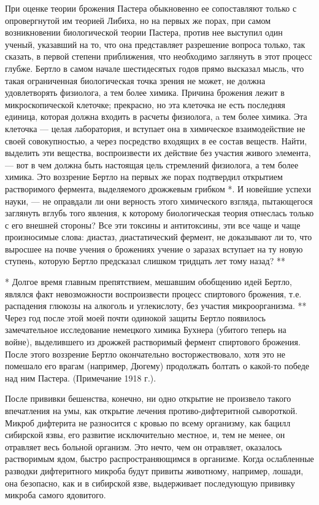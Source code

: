 При оценке теории брожения  Пастера обыкновенно ее сопоставляют только
с опровергнутой  им теорией Либиха, но  на первых же порах,  при самом
возникновении биологической  теории Пастера, против нее  выступил один
ученый,  указавший  на то,  что  она  представляет разрешение  вопроса
только,  так сказать,  в  первой степени  приближения, что  необходимо
заглянуть в  этот процесс глубже.  Бертло в самом  начале шестидесятых
годов прямо высказал мысль, что такая ограниченная биологическая точка
зрения  не  может, не  должна  удовлетворять  физиолога, а  тем  более
химика. Причина брожения лежит в микроскопической клеточке; прекрасно,
но эта  клеточка не есть  последняя единица, которая должна  входить в
расчеты  физиолога,  a  тем  более  химика.  Эта  клеточка  ---  целая
лаборатория,  и  вступает она  в  химическое  взаимодействие не  своей
совокупностью, а через посредство входящих в ее состав веществ. Найти,
выделить эти  вещества, воспроизвести  их действие без  участия живого
элемента,  ---  вот  в  чем  должна  быть  настоящая  цель  стремлений
физиолога,  а  тем  более  химика.  Это  воззрение  Бертло  на  первых
же  порах  подтвердил  открытием  растворимого  фермента,  выделяемого
дрожжевым грибком *. И новейшие успехи  науки, --- не оправдали ли они
верность этого химического взгляда,  пытающегося заглянуть вглубь того
явления,  к  которому  биологическая  теория отнеслась  только  с  его
внешней стороны?  Все эти токсины и  антитоксины, эти все чаще  и чаще
произносимые слова: диастаз, диастатический  фермент, не доказывают ли
то, что выросшее на почве учения о брожениях учение о заразах вступает
на ту  новую ступень, которую  Бертло предсказал слишком  тридцать лет
тому назад? **

* Долгое  время главным препятствием, мешавшим  обобщению идей Бертло,
являлся факт невозможности  воспроизвести процесс спиртового брожения,
т.е.  распадения  глюкозы  на  алкоголь  и  углекислоту,  без  участия
микроорганизма. **  Через год  после этой  моей почти  одинокой защиты
Бертло появилось  замечательное исследование немецкого  химика Бухнера
(убитого теперь на войне),  выделившего из дрожжей растворимый фермент
спиртового  брожения.   После  этого  воззрение   Бертло  окончательно
восторжествовало, хотя  это не помешало его  врагам (например, Дюгему)
продолжать болтать о какой-то победе над ним Пастера. (Примечание 1918
г.).

После  прививки  бешенства, конечно,  ни  одно  открытие не  произвело
такого впечатления  на умы,  как открытие  лечения противо-дифтеритной
сывороткой.  Микроб   дифтерита  не  разносится  с   кровью  по  всему
организму,  как  бацилл  сибирской язвы,  его  развитие  исключительно
местное,  и,  тем  не  менее,  он  отравляет  весь  больной  организм.
Это   нечто,   чем   он   отравляет,   оказалось   растворимым   ядом,
быстро  распространяющимся  в  организме. Когда  ослабленные  разводки
дифтеритного микроба  будут привиты  животному, например,  лошади, она
безопасно, как  и в  сибирской язве, выдерживает  последующую прививку
микроба самого ядовитого.

